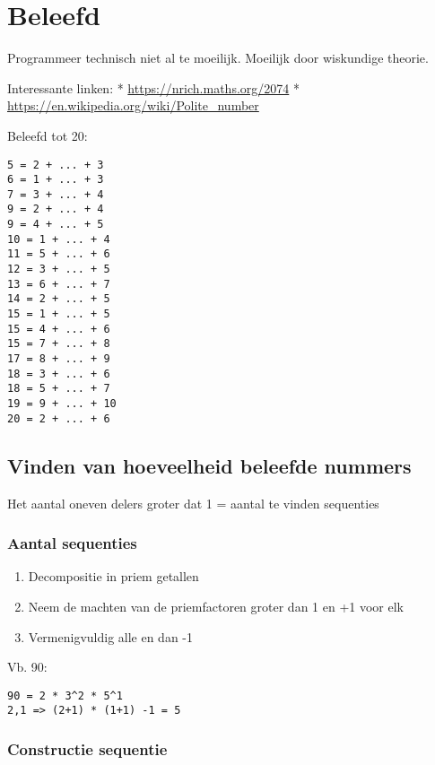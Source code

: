 \hypertarget{beleefd}{%
\section{Beleefd}\label{beleefd}}

Programmeer technisch niet al te moeilijk. Moeilijk door wiskundige
theorie.

Interessante linken: * \url{https://nrich.maths.org/2074} *
\url{https://en.wikipedia.org/wiki/Polite_number}

Beleefd tot 20:

\begin{verbatim}
5 = 2 + ... + 3
6 = 1 + ... + 3
7 = 3 + ... + 4
9 = 2 + ... + 4
9 = 4 + ... + 5
10 = 1 + ... + 4
11 = 5 + ... + 6
12 = 3 + ... + 5
13 = 6 + ... + 7
14 = 2 + ... + 5
15 = 1 + ... + 5
15 = 4 + ... + 6
15 = 7 + ... + 8
17 = 8 + ... + 9
18 = 3 + ... + 6
18 = 5 + ... + 7
19 = 9 + ... + 10
20 = 2 + ... + 6
\end{verbatim}

\hypertarget{vinden-van-hoeveelheid-beleefde-nummers}{%
\subsection{Vinden van hoeveelheid beleefde
nummers}\label{vinden-van-hoeveelheid-beleefde-nummers}}

Het aantal oneven delers groter dat 1 = aantal te vinden sequenties

\hypertarget{aantal-sequenties}{%
\subsubsection{Aantal sequenties}\label{aantal-sequenties}}

\begin{enumerate}
\def\labelenumi{\arabic{enumi}.}
\tightlist
\item
  Decompositie in priem getallen
\item
  Neem de machten van de priemfactoren groter dan 1 en +1 voor elk
\item
  Vermenigvuldig alle en dan -1
\end{enumerate}

Vb. 90:

\begin{verbatim}
90 = 2 * 3^2 * 5^1
2,1 => (2+1) * (1+1) -1 = 5
\end{verbatim}

\hypertarget{constructie-sequentie}{%
\subsubsection{Constructie sequentie}\label{constructie-sequentie}}

